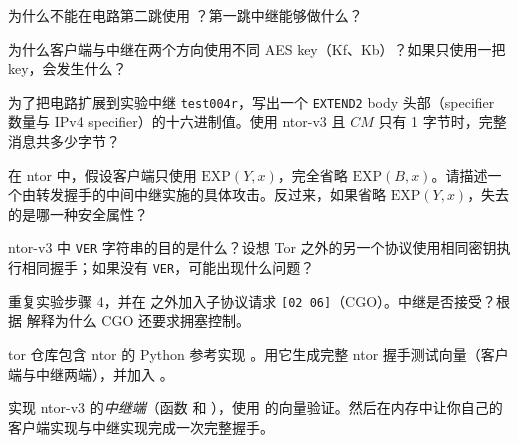 \begin{esercizio}[1]\label{es:09-fast}
为什么不能在电路第二跳使用 ？第一跳中继能够做什么？
\end{esercizio}

\begin{esercizio}[1]\label{es:09-direzioni}
为什么客户端与中继在两个方向使用不同 AES key（Kf、Kb）？如果只使用一把 key，会发生什么？
\end{esercizio}

\begin{esercizio}[2]\label{es:09-extend2}
为了把电路扩展到实验中继 \texttt{test004r}，写出一个 \texttt{EXTEND2} body 头部（specifier 数量与 IPv4 specifier）的十六进制值。使用 ntor-v3 且 $CM$ 只有 1 字节时，完整消息共多少字节？
\end{esercizio}

\begin{esercizio}[2]\label{es:09-ds}
在 ntor 中，假设客户端只使用 $\mathrm{EXP}(Y,x)$，完全省略 $\mathrm{EXP}(B,x)$。请描述一个由转发握手的中间中继实施的具体攻击。反过来，如果省略 $\mathrm{EXP}(Y,x)$，失去的是哪一种安全属性？
\end{esercizio}

\begin{esercizio}[2]\label{es:09-ver}
ntor-v3 中 \texttt{VER} 字符串的目的是什么？设想 Tor 之外的另一个协议使用相同密钥执行相同握手；如果没有 \texttt{VER}，可能出现什么问题？
\end{esercizio}

\begin{esercizio}[2]\label{es:09-cc}
重复实验步骤 4，并在  之外加入子协议请求 \texttt{[02 06]}（CGO）。中继是否接受？根据  解释为什么 CGO 还要求拥塞控制。
\end{esercizio}

\begin{esercizio}[3]\label{es:09-ntor-ref}
tor 仓库包含 ntor 的 Python 参考实现 。用它生成完整 ntor 握手测试向量（客户端与中继两端），并加入 。
\end{esercizio}

\begin{esercizio}[3]\label{es:09-relay}
实现 ntor-v3 的\emph{中继端}（函数  和 ），使用  的向量验证。然后在内存中让你自己的客户端实现与中继实现完成一次完整握手。
\end{esercizio}


